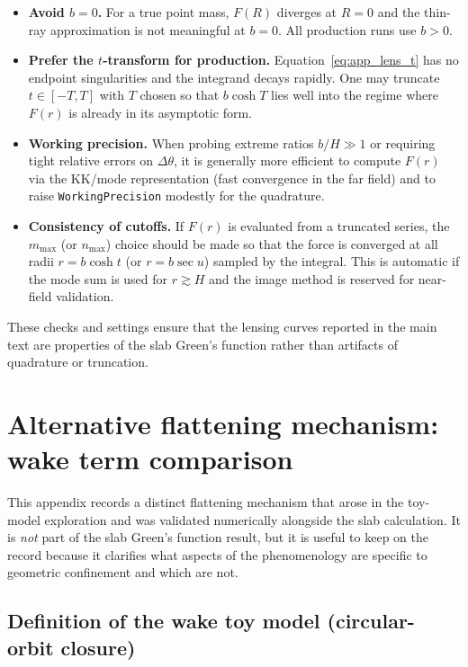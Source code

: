 \documentclass[11pt]{article}
\begin{document}
\begin{itemize}
\item \textbf{Avoid $b=0$.}  For a true point mass, $F(R)$ diverges at $R=0$ and the thin-ray
      approximation is not meaningful at $b=0$.  All production runs use $b>0$.

\item \textbf{Prefer the $t$-transform for production.}
      Equation~\eqref{eq:app_lens_t} has no endpoint singularities and the integrand decays rapidly.
      One may truncate $t\in[-T,T]$ with $T$ chosen so that $b\cosh T$ lies well into the regime where
      $F(r)$ is already in its asymptotic form.

\item \textbf{Working precision.}
      When probing extreme ratios $b/H\gg 1$ or requiring tight relative errors on $\Delta\theta$,
      it is generally more efficient to compute $F(r)$ via the KK/mode representation (fast
      convergence in the far field) and to raise \texttt{WorkingPrecision} modestly for the
      quadrature.

\item \textbf{Consistency of cutoffs.}
      If $F(r)$ is evaluated from a truncated series, the $m_{\max}$ (or $n_{\max}$) choice should be
      made so that the force is converged at all radii $r=b\cosh t$ (or $r=b\sec u$) sampled by the
      integral.  This is automatic if the mode sum is used for $r\gtrsim H$ and the image method is
      reserved for near-field validation.
\end{itemize}

These checks and settings ensure that the lensing curves reported in the main text are properties of
the slab Green's function rather than artifacts of quadrature or truncation.

\section{Alternative flattening mechanism: wake term comparison}
\label{app:wake}

This appendix records a distinct flattening mechanism that arose in the toy-model exploration and was
validated numerically alongside the slab calculation.  It is \emph{not} part of the slab Green's
function result, but it is useful to keep on the record because it clarifies what aspects of the
phenomenology are specific to geometric confinement and which are not.

\subsection{Definition of the wake toy model (circular-orbit closure)}
\end{document}
